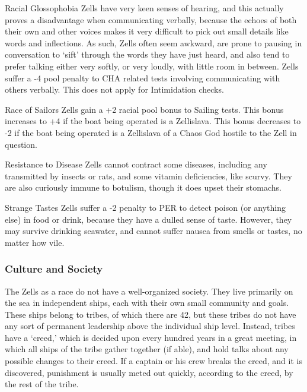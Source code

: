 \documentclass[oneside,11pt,english]{book}
\begin{document}
 

Racial Glossophobia 
Zells have very keen senses of hearing, and this actually proves a disadvantage when 
communicating verbally, because the echoes of both their own and other voices makes it very 
difficult to pick out small details like words and inflections. As such, Zells often seem awkward, 
are prone to pausing in conversation to ‘sift’ through the words they have just heard, and also 
tend to prefer talking either very softly, or very loudly, with little room in between. Zells suffer a 
-4 pool penalty to CHA related tests involving communicating with others verbally. This does not 
apply for Intimidation checks. 

 

Race of Sailors 
Zells gain a +2 racial pool bonus to Sailing tests. This bonus increases to +4 if the boat being 
operated is a Zellislava. This bonus decreases to -2 if the boat being operated is a Zellislava of a 
Chaos God hostile to the Zell in question. 

 

Resistance to Disease 
Zells cannot contract some diseases, including any transmitted by insects or rats, and some 
vitamin deficiencies, like scurvy. They are also curiously immune to botulism, though it does 
upset their stomachs. 

 

Strange Tastes 
Zells suffer a -2 penalty to PER to detect poison (or anything else) in food or drink, because they 
have a dulled sense of taste. However, they may survive drinking seawater, and cannot suffer 
nausea from smells or tastes, no matter how vile. 

 

\subsubsection*{Culture and Society} 
The Zells as a race do not have a well-organized society. They live primarily on the sea in independent 
ships, each with their own small community and goals. These ships belong to tribes, of which there are 
42, but these tribes do not have any sort of permanent leadership above the individual ship level. Instead, 
tribes have a ‘creed,’ which is decided upon every hundred years in a great meeting, in which all ships of 
the tribe gather together (if able), and hold talks about any possible changes to their creed. If a captain or 
his crew breaks the creed, and it is discovered, punishment is usually meted out quickly, according to the 
creed, by the rest of the tribe. 
\end{document}
